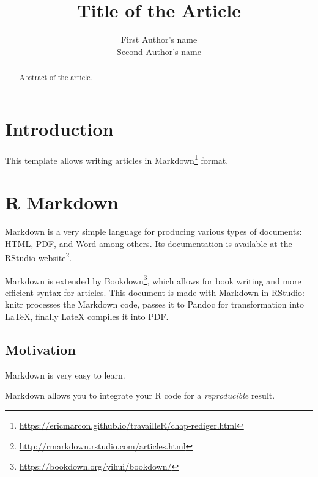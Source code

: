 \documentclass[fleqn,]{article} %
\title{Title of the Article} %
\author{
First Author's name\\ Second Author's name
} %
\begin{document}

\maketitle %

\begin{abstract}
Abstract of the article.
\end{abstract}


\thispagestyle{empty} %


\hypertarget{introduction}{%
\section{Introduction}\label{introduction}}

This template allows writing articles in Markdown\footnote{\url{https://ericmarcon.github.io/travailleR/chap-rediger.html}} format.

\hypertarget{markdown}{%
\section{R Markdown}\label{markdown}}

Markdown is a very simple language for producing various types of documents: HTML, PDF, and Word among others.
Its documentation is available at the RStudio website\footnote{\url{http://rmarkdown.rstudio.com/articles.html}}.

Markdown is extended by Bookdown\footnote{\url{https://bookdown.org/yihui/bookdown/}}, which allows for book writing and more efficient syntax for articles.
This document is made with Markdown in RStudio: knitr processes the Markdown code, passes it to Pandoc for transformation into LaTeX, finally LateX compiles it into PDF.

\hypertarget{motivation}{%
\subsection{Motivation}\label{motivation}}

Markdown is very easy to learn.

Markdown allows you to integrate your R code for a \emph{reproducible} result.
\end{document}
